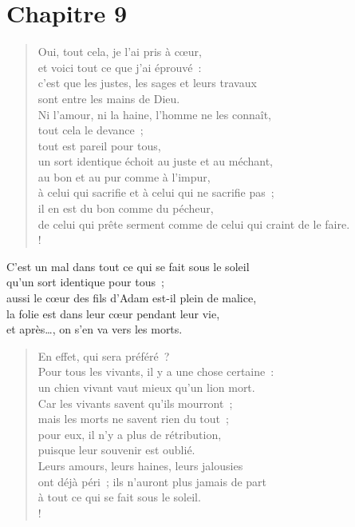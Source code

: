 \documentclass[french,twoside]{book} %
\def\mednobreak{\ifdim\lastskip<\medskipamount
  \removelastskip\nopagebreak\medskip\fi}
\newcommand{\labelblock}[1]{\medbreak{\noindent\color{rubric}\bfseries #1}\par\mednobreak}
\begin{document}
\section[Chapitre 9]{Chapitre 9}\renewcommand{\leftmark}{Chapitre 9}


\labelblock{Un même sort pour tous}


\begin{verse}
Oui, tout cela, je l’ai pris à cœur, \\
et voici tout ce que j’ai éprouvé : \\
c’est que les justes, les sages et leurs travaux \\
sont entre les mains de Dieu. \\
Ni l’amour, ni la haine, l’homme ne les connaît, \\
tout cela le devance ;\\
tout est pareil pour tous, \\
un sort identique échoit au juste et au méchant, \\
au bon et au pur comme à l’impur, \\
à celui qui sacrifie et à celui qui ne sacrifie pas ; \\
il en est du bon comme du pécheur, \\
de celui qui prête serment comme de celui qui craint de le faire.\\!
\end{verse}
C’est un mal dans tout ce qui se fait sous le soleil \\
qu’un sort identique pour tous ; \\
aussi le cœur des fils d’Adam est-il plein de malice, \\
la folie est dans leur cœur pendant leur vie, \\
et après…, on s’en va vers les morts.\\

\begin{verse}
En effet, qui sera préféré ? \\
Pour tous les vivants, il y a une chose certaine : \\
un chien vivant vaut mieux qu’un lion mort.\\
Car les vivants savent qu’ils mourront ; \\
mais les morts ne savent rien du tout ; \\
pour eux, il n’y a plus de rétribution, \\
puisque leur souvenir est oublié.\\
Leurs amours, leurs haines, leurs jalousies \\
ont déjà péri ; ils n’auront plus jamais de part \\
à tout ce qui se fait sous le soleil.\\!
\end{verse}
\end{document}
